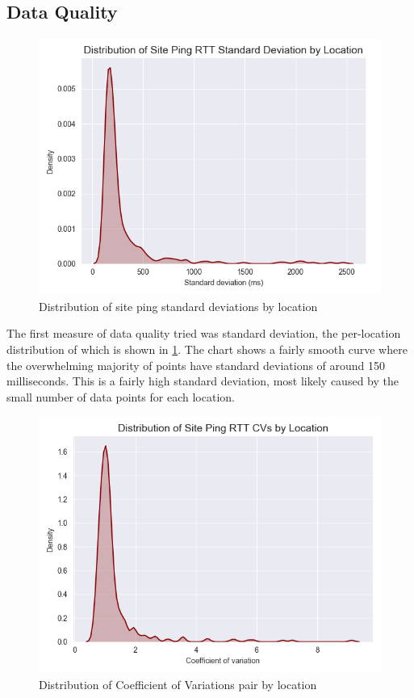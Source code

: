 \subsection{Data Quality}

\begin{figure}[h]
    \centering
    \includegraphics{images/siteping/siteping_rtt_stdev_distribution.png}
    \caption{Distribution of site ping standard deviations by location}
    \label{fig:siteping_stdev_dist}
\end{figure}

The first measure of data quality tried was standard deviation, the per-location distribution of which is shown in  \cref{fig:siteping_stdev_dist}. The chart shows a fairly smooth curve where the overwhelming majority of points have standard deviations of around 150 milliseconds. This is a fairly high standard deviation, most likely caused by the small number of data points for each location.

\begin{figure}[h]
    \centering
    \includegraphics{images/siteping/siteping_rtt_cv_distribution.png}
    \caption{Distribution of Coefficient of Variations pair by location}
    \label{fig:siteping_cv_dist}
\end{figure}

